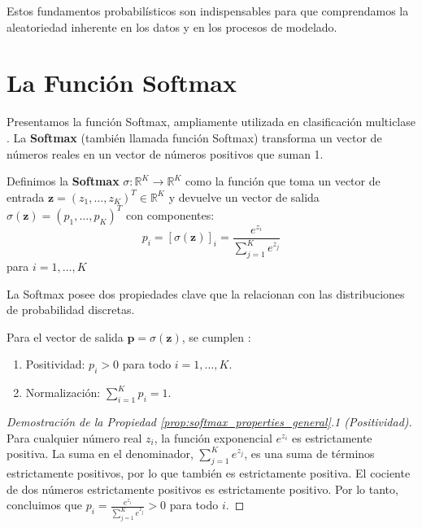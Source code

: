 Estos fundamentos probabilísticos son indispensables para que comprendamos la aleatoriedad inherente en los datos y en los procesos de modelado.

\section{La Función Softmax}
\label{subsec:softmax_general}

Presentamos la función Softmax, ampliamente utilizada en clasificación multiclase \citep{Bishop2006}. La \textbf{Softmax} (también llamada función Softmax) transforma un vector de números reales en un vector de números positivos que suman 1.

\begin{definition}[Softmax]
\label{def:softmax_general}
Definimos la \textbf{Softmax} $\sigma: \mathbb{R}^K \to \mathbb{R}^K$ como la función que toma un vector de entrada $\mathbf{z} = (z_1, \dots, z_K)^T \in \mathbb{R}^K$ y devuelve un vector de salida $\sigma(\mathbf{z}) = (p_1, \dots, p_K)^T$ con componentes:
\[ p_i = [\sigma(\mathbf{z})]_i = \frac{e^{z_i}}{\sum_{j=1}^K e^{z_j}} \]
para $i=1, \dots, K$
\end{definition}

La Softmax posee dos propiedades clave que la relacionan con las distribuciones de probabilidad discretas.

\begin{proposition}
\label{prop:softmax_properties_general}
Para el vector de salida $\mathbf{p} = \sigma(\mathbf{z})$, se cumplen \citep{Bishop2006}:
\begin{enumerate}
    \item Positividad: $p_i > 0$ para todo $i=1, \dots, K$.
    \item Normalización: $\sum_{i=1}^K p_i = 1$.
\end{enumerate}
\end{proposition}

\begin{proof}[Demostración de la Propiedad \ref{prop:softmax_properties_general}.1 (Positividad)]
Para cualquier número real $z_i$, la función exponencial $e^{z_i}$ es estrictamente positiva. La suma en el denominador, $\sum_{j=1}^K e^{z_j}$, es una suma de términos estrictamente positivos, por lo que también es estrictamente positiva. El cociente de dos números estrictamente positivos es estrictamente positivo. Por lo tanto, concluimos que $p_i = \frac{e^{z_i}}{\sum_{j=1}^K e^{z_j}} > 0$ para todo $i$.
\end{proof}

